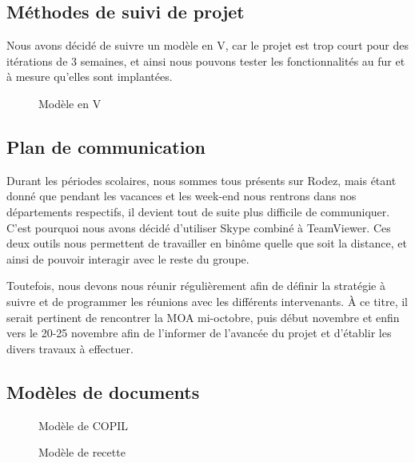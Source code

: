 \documentclass[11pt]{report}
\begin{document}
\subsection{Méthodes de suivi de projet}
Nous avons décidé de suivre un modèle en V, car le projet est trop court pour 
des itérations de 3 semaines, et ainsi nous pouvons tester les fonctionnalités 
au fur et à mesure qu'elles sont implantées.
\begin{figure}[htp] 
\caption{Modèle en V}
\end{figure}

\subsection{Plan de communication}
Durant les périodes scolaires, nous sommes tous présents sur Rodez, mais étant 
donné que pendant les vacances et les week-end nous rentrons dans nos 
départements respectifs, il devient tout de suite plus difficile de communiquer.
C'est pourquoi nous avons décidé d'utiliser Skype combiné à TeamViewer. Ces 
deux outils nous permettent de travailler en binôme quelle que soit la 
distance, et ainsi de pouvoir interagir avec le reste du groupe.\\
\par Toutefois, nous devons nous réunir régulièrement afin de définir la 
stratégie à suivre et de programmer les réunions avec les différents 
intervenants. À ce titre, il serait pertinent de rencontrer la MOA mi-octobre, 
puis début novembre et enfin vers le 20-25 novembre afin de l'informer 
de l’avancée du projet et d'établir les divers travaux à effectuer.
\newpage

\subsection{Modèles de documents}
\begin{figure}[htp] \centering{
}
\caption{Modèle de COPIL}
\end{figure}
\newpage
\begin{figure}[htp] \centering{
}
\caption{Modèle de recette}
\end{figure}
\newpage
\end{document}
